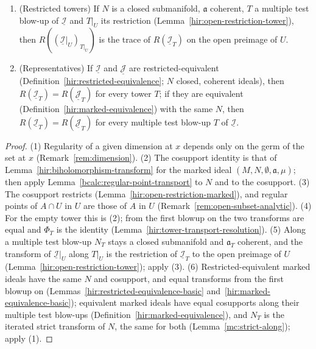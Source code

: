 \begin{proposition}
\begin{enumerate}
(Definition~\ref{hir:tower-transport}), then \(R(\Phi^*\underline{\mathcal I}_{\Phi^*T})=\Phi_T^{-1}R(\underline{\mathcal I}_T)\).
\item (Restricted towers) If \(N\) is a closed submanifold, \(\mathfrak a\) coherent, \(T\) a multiple test blow-up of \(\underline{\mathcal I}\) and \(T|_U\) its restriction
(Lemma~\ref{hir:open-restriction-tower}), then \(R((\underline{\mathcal I}|_U)_{T|_U})\) is the trace of \(R(\underline{\mathcal I}_T)\) on the open preimage of \(U\).
\item (Representatives) If \(\underline{\mathcal I}\) and \(\underline{\mathcal J}\) are restricted-equivalent (Definition~\ref{hir:restricted-equivalence}; \(N\) closed, coherent
ideals), then \(R(\underline{\mathcal I}_T)=R(\underline{\mathcal J}_T)\) for every tower \(T\); if they are equivalent (Definition~\ref{hir:marked-equivalence}) with the same \(N\),
then \(R(\underline{\mathcal I}_T)=R(\underline{\mathcal J}_T)\) for every multiple test blow-up \(T\) of \(\underline{\mathcal I}\).
\end{enumerate}
\end{proposition}
\begin{proof}
\mixedleanok
(1) Regularity of a given dimension at \(x\) depends only on the germ of the set at \(x\) (Remark~\ref{rem:dimension}). (2) The cosupport identity is that of
Lemma~\ref{hir:biholomorphism-transform} for the marked ideal \((M,N,\emptyset,\mathfrak a,\mu)\); then apply Lemma~\ref{bcalc:regular-point-transport} to \(N\) and to the
cosupport. (3) The cosupport restricts (Lemma~\ref{hir:open-restriction-marked}), and regular points of \(A\cap U\) in \(U\) are those of \(A\) in \(U\)
(Remark~\ref{rem:open-subset-analytic}). (4) For the empty tower this is (2); from the first blowup on the two transforms are equal and \(\Phi_T\) is the identity
(Lemma~\ref{hir:tower-transport-resolution}). (5) Along a multiple test blow-up \(N_T\) stays a closed submanifold and \(\mathfrak a_T\) coherent, and the transform of
\(\underline{\mathcal I}|_U\) along \(T|_U\) is the restriction of \(\underline{\mathcal I}_T\) to the open preimage of \(U\) (Lemma~\ref{hir:open-restriction-tower}); apply (3).
(6) Restricted-equivalent marked ideals have the same \(N\) and cosupport, and equal transforms from the first blowup on
(Lemmas~\ref{hir:restricted-equivalence-basic} and~\ref{hir:marked-equivalence-basic}); equivalent marked ideals have equal cosupports along their multiple test
blow-ups (Definition~\ref{hir:marked-equivalence}), and \(N_T\) is the iterated strict transform of \(N\), the same for both (Lemma~\ref{mc:strict-along}); apply (1).
\end{proof}

